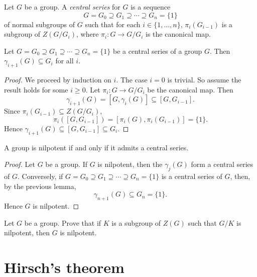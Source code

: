 \begin{definition}
Let $G$ be a group. A \emph{central series} for $G$ 
is a sequence 
	\[
		G=G_0\supseteq G_1\supseteq\cdots\supseteq G_n=\{1\}
	\]
of normal subgroups of $G$ such that 
for each $i\in\{1,\dots,n\}$, 
$\pi_i(G_{i-1})$ is a subgroup of $Z(G/G_i)$, where  $\pi_i\colon G\to
G/G_i$ is the canonical map.
\end{definition}

\begin{lemma}
\label{lem:central_series}
Let $G=G_0\supseteq G_1\supseteq\cdots\supseteq G_n=\{1\}$ be 
a central series of a group $G$. Then $\gamma_{i+1}(G)\subseteq G_i$ for all $i$.
\end{lemma}

\begin{proof}
We proceed by induction on $i$. The case $i=0$ is trivial. So assume the result holds for some
$i\geq0$. Let  
	$\pi_i\colon G\to
	G/G_i$ be the canonical map. 
	Then  
	\[
	\gamma_{i+1}(G)=[G,\gamma_i(G)]\subseteq [G,G_{i-1}].
	\]
	Since $\pi_i(G_{i-1})\subseteq Z(G/G_{i})$, 
	\[
        \pi_i([G,G_{i-1}])=[\pi_i(G),\pi_i(G_{i-1})]=\{1\}.
        \]
        Hence $\gamma_{i+1}(G)\subseteq [G,G_{i-1}]\subseteq G_i$. 
\end{proof}


\begin{theorem}
A group is nilpotent if and only if it admits a central series. 
\end{theorem}

\begin{proof}
Let $G$ be a group. If $G$ is nilpotent, then the $\gamma_j(G)$ form a central series of 
$G$. Conversely, if $G=G_0\supseteq
G_1\supseteq\cdots\supseteq G_n=\{1\}$ is a central series of $G$, 
then, by the previous lemma,  
	\[
	\gamma_{n+1}(G)\subseteq G_n=\{1\}.
	\]
Hence $G$ is nilpotent. 
\end{proof}

\begin{exercise}
\label{xca:nilpotent_central}
Let $G$ be a group. Prove that if $K$ is a subgroup of $Z(G)$ such that 
$G/K$ is nilpotent, then $G$ is nilpotent. 
\end{exercise}

\section{Hirsch's theorem}

